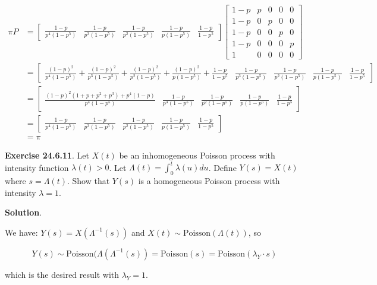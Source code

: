 \[ 
\begin{align}
\pi P &= \begin{bmatrix} \frac{1 - p}{p^4(1 - p^5)} &
\frac{1 - p}{p^3(1 - p^5)} &
\frac{1 - p}{p^2(1 - p^5)} &
\frac{1 - p}{p(1 - p^5)} &
\frac{1 - p}{1 - p^5}
\end{bmatrix}
\begin{bmatrix}
1 - p & p & 0 & 0 & 0 \\
1 - p & 0 & p & 0 & 0 \\
1 - p & 0 & 0 & p & 0 \\
1 - p & 0 & 0 & 0 & p \\
1 & 0 & 0 & 0 & 0
\end{bmatrix} \\
&= \begin{bmatrix} 
\frac{(1 - p)^2}{p^4(1 - p^5)}
+ \frac{(1 - p)^2}{p^3(1 - p^5)}
+ \frac{(1 - p)^2}{p^2(1 - p^5)}
+ \frac{(1 - p)^2}{p(1 - p^5)}
+ \frac{1 - p}{1 - p^5} &
\frac{1 - p}{p^3(1 - p^5)} &
\frac{1 - p}{p^2(1 - p^5)} &
\frac{1 - p}{p(1 - p^5)} &
\frac{1 - p}{1 - p^5}
\end{bmatrix} \\
&= \begin{bmatrix} 
\frac{(1 - p)^2(1 + p + p^2 + p^3) + p^4(1 - p)}{p^4(1 - p^5)} &
\frac{1 - p}{p^3(1 - p^5)} &
\frac{1 - p}{p^2(1 - p^5)} &
\frac{1 - p}{p(1 - p^5)} &
\frac{1 - p}{1 - p^5}
\end{bmatrix} \\
&= \begin{bmatrix} 
\frac{1 - p}{p^4(1 - p^5)} &
\frac{1 - p}{p^3(1 - p^5)} &
\frac{1 - p}{p^2(1 - p^5)} &
\frac{1 - p}{p(1 - p^5)} &
\frac{1 - p}{1 - p^5}
\end{bmatrix} \\
&= \pi
\end{align}
\]

\textbf{Exercise 24.6.11}. Let \(X(t)\) be an inhomogeneous Poisson
process with intensity function \(\lambda(t) > 0\). Let
\(\Lambda(t) = \int_0^t \lambda(u) du\). Define \(Y(s) = X(t)\) where
\(s = \Lambda(t)\). Show that \(Y(s)\) is a homogeneous Poisson process
with intensity \(\lambda = 1\).

\textbf{Solution}.

We have: \(Y(s) = X(\Lambda^{-1}(s))\) and
\(X(t) \sim \text{Poisson}(\Lambda(t))\), so

\[Y(s) \sim \text{Poisson}(\Lambda(\Lambda^{-1}(s)) = \text{Poisson}(s) = \text{Poisson}(\lambda_Y \cdot s)\]

which is the desired result with \(\lambda_Y = 1\).

